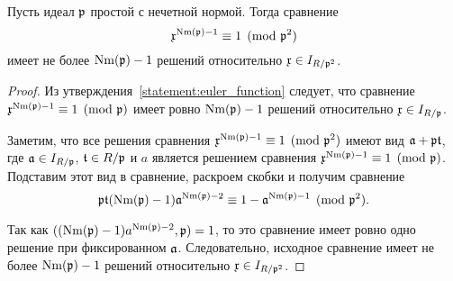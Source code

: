 \documentclass[_00_dissertation.tex]{subfiles}
\begin{document}
\begin{proposition}\label{proposition:miller_criteria_character}
    Пусть идеал $\mathfrak{p}$ простой с нечетной нормой.
    Тогда сравнение
    \begin{equation*}
        \mathfrak{x}^{\textrm{Nm}(\mathfrak{p}) - 1} \equiv 1 \pmod{\mathfrak{p}^2}
    \end{equation*}
    имеет не более $\textrm{Nm}(\mathfrak{p}) - 1$ решений относительно $\mathfrak{x} \in I_{R/\mathfrak{p}^2}$.
\end{proposition}
\begin{proof}
    Из утверждения~\ref{statement:euler_function} следует, что сравнение $\mathfrak{x}^{\textrm{Nm}(\mathfrak{p}) - 1} \equiv 1 \pmod{\mathfrak{p}}$ имеет ровно $\textrm{Nm}(\mathfrak{p}) - 1$ решений относительно $\mathfrak{x} \in I_{R/\mathfrak{p}}$.
    
    Заметим, что все решения сравнения $\mathfrak{x}^{\textrm{Nm}(\mathfrak{p}) - 1} \equiv 1 \pmod{\mathfrak{p}^2}$ имеют вид $\mathfrak{a} + \mathfrak{p}\mathfrak{t}$, где $\mathfrak{a} \in I_{R/\mathfrak{p}}$, $\mathfrak{t} \in R/\mathfrak{p}$ и $a$ является решением сравнения $\mathfrak{x}^{\textrm{Nm}(\mathfrak{p}) - 1} \equiv 1 \pmod{\mathfrak{p}}$.
    Подставим этот вид в сравнение, раскроем скобки и получим сравнение
    \begin{equation*}
        \mathfrak{p}\mathfrak{t}(\textrm{Nm}(\mathfrak{p}) - 1)\mathfrak{a}^{\textrm{Nm}(\mathfrak{p}) - 2} \equiv 1 - \mathfrak{a}^{\textrm{Nm}(\mathfrak{p}) - 1} \pmod{\mathfrak{p}^2}.
    \end{equation*}
    
    Так как $((\textrm{Nm}(\mathfrak{p}) - 1)a^{\textrm{Nm}(\mathfrak{p}) - 2}, \mathfrak{p}) = 1$, то это сравнение имеет ровно одно решение при фиксированном $\mathfrak{a}$.
    Следовательно, исходное сравнение имеет не более $\textrm{Nm}(\mathfrak{p}) - 1$ решений относительно $\mathfrak{x} \in I_{R/\mathfrak{p}^2}$.
\end{proof}
\end{document}

